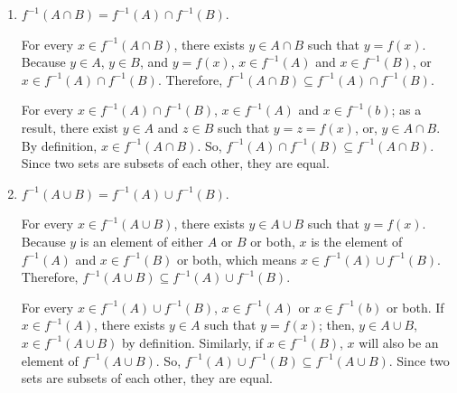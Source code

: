 \documentclass{article}
\begin{document}
\begin{enumerate}
\item $f^{-1}(A \cap B) = f^{-1}(A) \cap f^{-1}(B)$.

\Proof{} For every $x \in f^{-1}(A \cap B)$, there exists $y \in A \cap B$ such that $y = f(x)$. Because $y \in A$, $y \in B$, and $y = f(x)$, $x \in f^{-1}(A)$ and $x \in f^{-1}(B)$, or $x \in f^{-1}(A) \cap f^{-1}(B)$. Therefore, $f^{-1}(A \cap B) \subseteq f^{-1}(A) \cap f^{-1}(B)$.

For every $x \in f^{-1}(A) \cap f^{-1}(B)$, $x \in f^{-1}(A)$ and $x \in f^{-1}(b)$; as a result, there exist $y \in A$ and $z \in B$ such that $y = z = f(x)$, or, $y \in A \cap B$. By definition, $x \in f^{-1}(A \cap B)$. So, $f^{-1}(A) \cap f^{-1}(B) \subseteq f^{-1}(A \cap B)$. Since two sets are subsets of each other, they are equal. \QED

\item $f^{-1}(A \cup B) = f^{-1}(A) \cup f^{-1}(B)$.

\Proof{} For every $x \in f^{-1}(A \cup B)$, there exists $y \in A \cup B$ such that $y = f(x)$. Because $y$ is an element of either $A$ or $B$ or both, $x$ is the element of $f^{-1}(A)$ and $x \in f^{-1}(B)$ or both, which means $x \in f^{-1}(A) \cup f^{-1}(B)$. Therefore, $f^{-1}(A \cup B) \subseteq f^{-1}(A) \cup f^{-1}(B)$.

For every $x \in f^{-1}(A) \cup f^{-1}(B)$, $x \in f^{-1}(A)$ or $x \in f^{-1}(b)$ or both. If $x \in f^{-1}(A)$, there exists $y \in A$ such that $y = f(x)$; then, $y \in A \cup B$, $x \in f^{-1}(A \cup B)$ by definition. Similarly, if $x \in f^{-1}(B)$, $x$ will also be an element of $f^{-1}(A \cup B)$. So, $f^{-1}(A) \cup f^{-1}(B) \subseteq f^{-1}(A \cup B)$. Since two sets are subsets of each other, they are equal. \QED
\end{enumerate}
\end{document}
